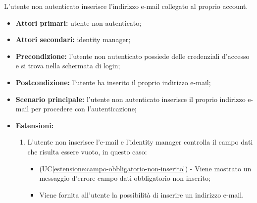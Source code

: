 L'utente non autenticato inserisce l'indirizzo e-mail collegato al proprio account.
\begin{itemize}
	\item \textbf{Attori primari:} utente non autenticato;
	\item \textbf{Attori secondari:} identity manager;
	\item \textbf{Precondizione:} l'utente non autenticato possiede delle credenziali d'accesso e si trova nella schermata di login;
	\item \textbf{Postcondizione:}  l'utente ha inserito il proprio indirizzo e-mail;
	\item \textbf{Scenario principale:} l'utente non autenticato inserisce il proprio indirizzo e-mail per procedere con l'autenticazione;
	\item \textbf{Estensioni:}
	\begin{enumerate}[label=\lett]
		\item L'utente non inserisce l'e-mail e l'identity manager controlla il campo dati che risulta essere vuoto, in questo caso:
		\begin{itemize}
			\item (UC\ref{estensione:campo-obbligatorio-non-inserito}) - Viene mostrato un messaggio d'errore campo dati obbligatorio non inserito;
			\item Viene fornita all'utente la possibilità di inserire un indirizzo e-mail.
		\end{itemize}
	\end{enumerate}
\end{itemize}

\label{autenticazione-piattaforma.modulo.password}

